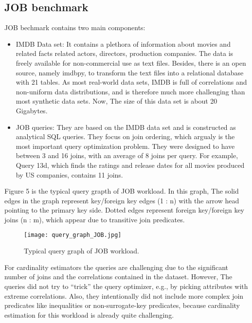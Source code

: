 \subsection{JOB benchmark}
{\justify
JOB bechmark \cite{JOB} contains two main components:
\begin{itemize}
\item IMDB Data set: It contains a plethora of information about movies and related facts related actors, directors, production companies. The data is freely available for non-commercial use as text files. Besides, there is an open source, namely imdbpy, to transform the text files into a relational database with 21 tables. As most real-world  data sets, IMDB is full of correlations and non-uniform data distributions, and is therefore much more challenging than most synthetic data sets. Now, The size of this data set is about 20 Gigabytes.
\end{itemize}
\begin{itemize}
\item JOB queries: They are based on the IMDB data set and is constructed as analytical SQL queries. They focus on join ordering, which argualy is the most important query optimization problem. They were designed to have between 3 and 16 joins, with an average of 8 joins per query. For example, Query 13d, which finds the ratings and release dates for all movies produced by US companies, contains 11 joins.
\end{itemize}
{
Figure 5 is the typical query grapth of JOB workload. In this graph, The solid edges in the graph represent key/foreign key edges (1 : n) with the arrow head pointing to the primary key side. Dotted edges represent foreign key/foreign key joins (n : m), which appear due to transitive join predicates.
\par }
{
\begin{figure}[H]
\centering
\texttt{[image: query\_graph\_JOB.jpg]}
\caption{Typical query graph of JOB workload.}
\end{figure}
}
{
For cardinality estimators the queries are challenging due to the significant number of joins and the correlations contained in the dataset. However, The queries did not try to “trick” the query optimizer, e.g., by picking attributes with extreme correlations. Also, they intentionally did not include more complex join predicates like inequalities or non-surrogate-key predicates, because cardinality estimation for this workload is already quite challenging.
\par }
}

